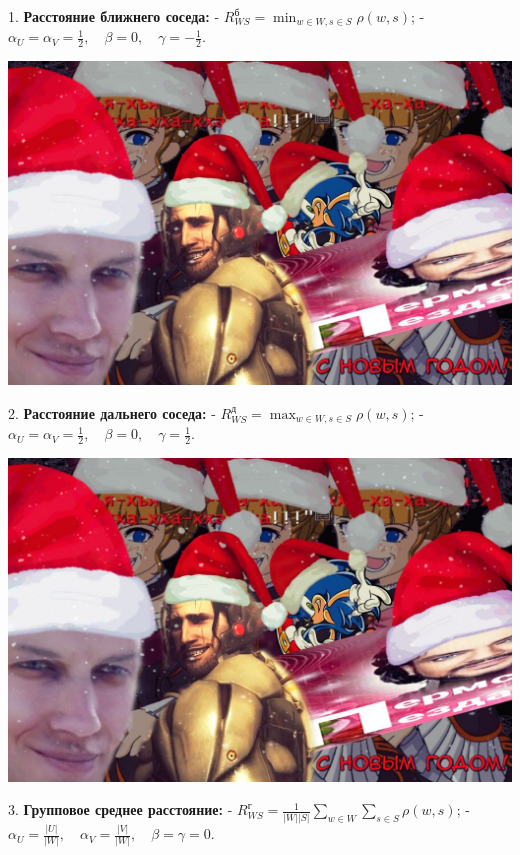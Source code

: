 1. \textbf{Расстояние ближнего соседа:}
    - $\displaystyle R_{WS}^{б} = \min_{w \in W, s \in S}{\rho{(w, s)}}$;
    - $\alpha_U = \alpha_V = \frac{1}{2}, \quad \beta = 0, \quad \gamma = -\frac{1}{2}$.

\includegraphics[scale=0.3]{figures/samplefigure.jpg}

2. \textbf{Расстояние дальнего соседа:}
    - $\displaystyle R_{WS}^{д} = \max_{w \in W, s \in S}{\rho{(w, s)}}$;
    - $\alpha_U = \alpha_V = \frac{1}{2}, \quad \beta = 0, \quad \gamma = \frac{1}{2}$.

\includegraphics[scale=0.3]{figures/samplefigure.jpg}

3. \textbf{Групповое среднее расстояние:}
    - $\displaystyle R_{WS}^{г} = \frac{1}{{\vert W \vert}{\vert S \vert}} \sum_{w \in W}{\sum_{s \in S}{\rho{(w, s)}}}$;
    - $\alpha_U = \frac{\vert U \vert}{\vert W \vert}, \quad \alpha_V = \frac{\vert V \vert}{\vert W \vert}, \quad \beta = \gamma = 0$.

